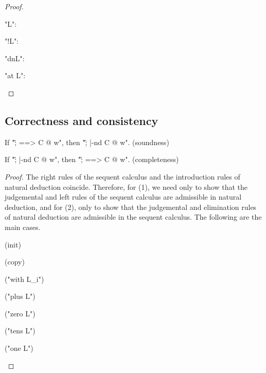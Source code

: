 \documentclass{article}
\begin{document}
\begin{lem}
\begin{proof}
\begin{ecom} 
  \item "\exists L":
    

  \item "!L":
    

  \item "{dn}L":
    

  \item "at L":
    
  \end{ecom}
\end{proof}

\subsection{Correctness and consistency}
\label{sec:proofs.correct}

\begin{thm} \mbox{}
  \begin{ecom}
  \item If "\G ; \D ==> C @ w", then "\G ; \D |-nd C @ w". (soundness)
  \item If "\G ; \D |-nd C @ w", then "\G ; \D ==> C @ w". (completeness)
  \end{ecom}
\end{thm}

\begin{proof}
  The right rules of the sequent calculus and the introduction rules of natural deduction
  coincide. Therefore, for (1), we need only to show that the judgemental and left rules of the
  sequent calculus are admissible in natural deduction, and for (2), only to show that the
  judgemental and elimination rules of natural deduction are admissible in the sequent calculus. The
  following are the main cases.
  \begin{ecom} ["==>"/"|-nd" {case}.]  
  \item (init) 
    
  \item (copy)
    
  \item ("with L_i")
    
  \item ("plus L")
    
  \item ("zero L")
    
  \item ("tens L")
    
  \item ("one L")
    

\end{ecom}
\end{proof}
\end{lem}
\end{document}
